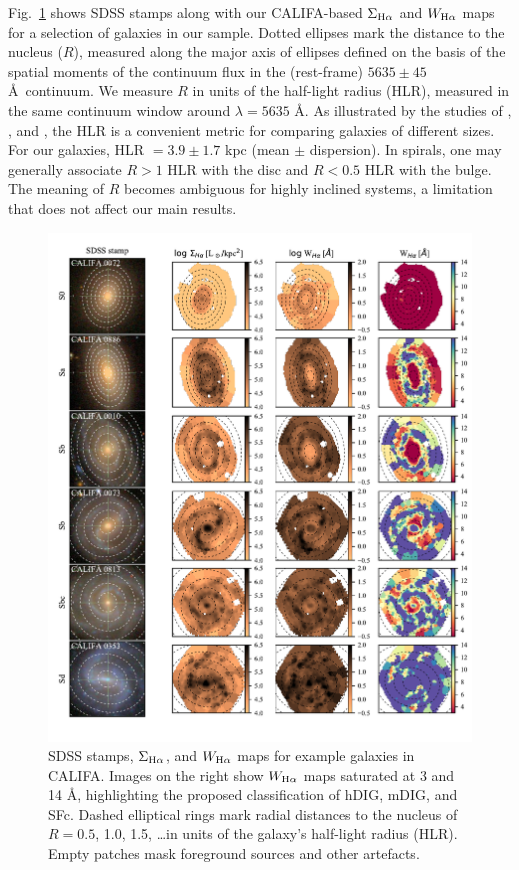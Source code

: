 \documentclass[a4paper, fleqn, usenatbib, useAMS]{mnras}
\newcommand{\Ha}{\ifmmode {\rm H}\alpha \else H$\alpha$\fi\xspace}
\begin{document}
Fig.\ \ref{fig:ExampleMaps} shows SDSS stamps along with our CALIFA-based $\Sigma_{\Ha}$ and $W_{\Ha}$ maps for a selection of galaxies in our sample. Dotted ellipses mark the distance to the nucleus ($R$), measured along the major axis of ellipses defined on the basis of the spatial moments of the continuum flux in the (rest-frame) $5635 \pm 45$ \AA\ continuum. We measure $R$ in units of the half-light radius (HLR), measured in the same continuum window around $\lambda = 5635$ \AA. As illustrated by the studies of \citet{Perez.etal.2013}, \citet{Sanchez.etal.2014}, and \citet{GonzalezDelgado.etal.2016a}, the HLR is a convenient metric for comparing galaxies of different sizes. For our galaxies, HLR $= 3.9 \pm 1.7$ kpc (mean $\pm$ dispersion). In spirals, one may generally associate $R > 1$ HLR with the disc and $R < 0.5$ HLR with the bulge. The meaning of $R$ becomes ambiguous for highly inclined systems, a limitation that does not affect our main results.

\begin{figure}
\includegraphics{figs/fig_maps_class_faceon_paper.pdf}
 \caption{SDSS stamps, $\Sigma_{\Ha}$, and $W_{\Ha}$ maps for example galaxies in CALIFA. Images on the right show $W_{\Ha}$ maps saturated at 3 and 14 \AA, highlighting the proposed classification of hDIG, mDIG, and SFc. Dashed elliptical rings mark radial distances to the nucleus of $R = 0.5$, 1.0, 1.5, \ldots in units of the galaxy's half-light radius (HLR). Empty patches mask foreground sources and other artefacts.
 }
 \label{fig:ExampleMaps}
\end{figure}
\end{document}
